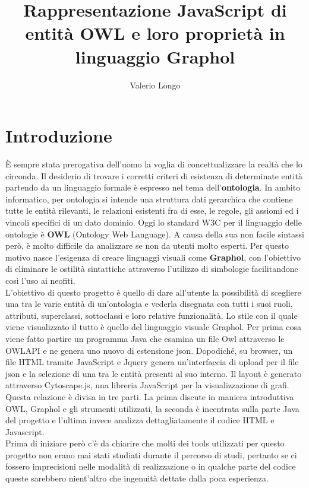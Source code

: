 \documentclass[Lau,binding=0.6cm]{sapthesis}
\title{Rappresentazione JavaScript di entità OWL e loro proprietà in linguaggio Graphol}
\author{Valerio Longo}
\begin{document}
\frontmatter

\maketitle


\tableofcontents

\frontmatter
\chapter{Introduzione} È sempre stata prerogativa dell'uomo la voglia di concettualizzare la realtà che lo circonda. Il desiderio di trovare i corretti criteri di esistenza di determinate entità partendo da un linguaggio formale è espresso nel tema dell'\textbf{ontologia}. In ambito informatico, per ontologia si intende una struttura dati gerarchica che contiene tutte le entità rilevanti, le relazioni esistenti fra di esse, le regole, gli assiomi ed i vincoli specifici di un dato dominio. 
Oggi lo standard W3C per il linguaggio delle ontologie è \textbf{OWL} (Ontology Web Language). A causa della sua non facile sintassi però, è molto difficile da analizzare se non da utenti molto esperti. Per questo motivo nasce l'esigenza di creare linguaggi visuali come \textbf{Graphol}, con l'obiettivo di eliminare le ostilità sintattiche attraverso l'utilizzo di simbologie facilitandone così l'uso ai neofiti.\\L'obiettivo di questo progetto è quello di dare all'utente la possibilità di scegliere una tra le varie entità di un'ontologia e vederla disegnata con tutti i suoi ruoli, attributi, superclassi, sottoclassi e loro relative funzionalità. Lo stile con il quale viene visualizzato il tutto è quello del linguaggio visuale Graphol. Per prima cosa viene fatto partire un programma Java che esamina un file Owl attraverso le OWLAPI e ne genera uno nuovo di estensione json. Dopodiché, su browser, un file HTML tramite JavaScript e Jquery genera un'interfaccia di upload per il file  json e la selezione di una tra le entità presenti al suo interno. Il layout è generato attraverso Cytoscape.js, una libreria JavaScript per la visualizzazione di grafi.\\ Questa relazione è divisa in tre parti. La prima discute in maniera introduttiva OWL, Graphol e gli strumenti utilizzati, la seconda è incentrata sulla parte Java del progetto e l'ultima invece analizza dettagliatamente il codice HTML e Javascript.
\\Prima di iniziare però c'è da chiarire che molti dei tools utilizzati per questo progetto non erano mai stati studiati durante il percorso di studi, pertanto se ci fossero imprecisioni nelle modalità di realizzazione o in qualche parte del codice queste sarebbero nient'altro che ingenuità dettate dalla poca esperienza.
\mainmatter
\end{document}
